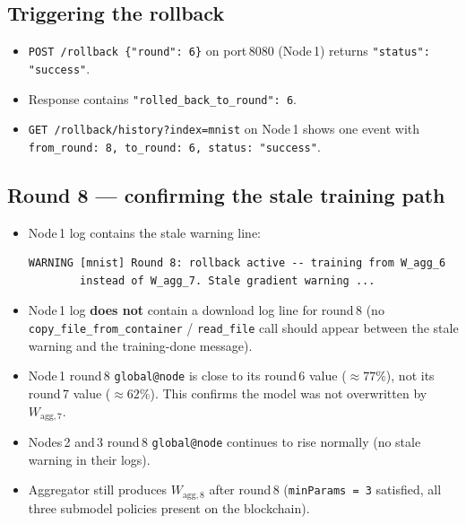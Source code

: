 \documentclass[11pt,a4paper]{article}
\newcommand{\Wagg}[1]{$W_{\text{agg},#1}$}
\begin{document}
\subsection{Triggering the rollback}

\begin{itemize}
  \item[$\square$] \texttt{POST /rollback \{"round": 6\}} on port\,8080
        (Node\,1) returns \texttt{"status": "success"}.
  \item[$\square$] Response contains \texttt{"rolled\_back\_to\_round": 6}.
  \item[$\square$] \texttt{GET /rollback/history?index=mnist} on Node\,1
        shows one event with
        \texttt{from\_round: 8, to\_round: 6, status: "success"}.
\end{itemize}

\subsection{Round 8 --- confirming the stale training path}

\begin{itemize}
  \item[$\square$] Node\,1 log contains the stale warning line:
  \begin{lstlisting}[style=log]
WARNING [mnist] Round 8: rollback active -- training from W_agg_6
        instead of W_agg_7. Stale gradient warning ...
  \end{lstlisting}
  \item[$\square$] Node\,1 log \textbf{does not} contain a download log line
        for round\,8 (no \texttt{copy\_file\_from\_container} /
        \texttt{read\_file} call should appear between the stale warning
        and the training-done message).
  \item[$\square$] Node\,1 round\,8 \texttt{global@node} is close to its
        round\,6 value ($\approx 77\%$), not its round\,7 value
        ($\approx 62\%$).  This confirms the model was not overwritten
        by \Wagg{7}.
  \item[$\square$] Nodes\,2 and\,3 round\,8 \texttt{global@node} continues
        to rise normally (no stale warning in their logs).
  \item[$\square$] Aggregator still produces \Wagg{8} after round\,8
        (\texttt{minParams\,=\,3} satisfied, all three submodel policies
        present on the blockchain).
\end{itemize}
\end{document}
